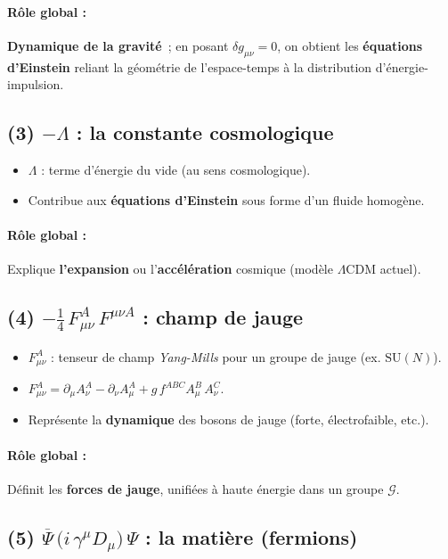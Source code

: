 \documentclass[12pt]{article}
\begin{document}
\paragraph{R\^ole global :}
\textbf{Dynamique de la gravit\'e}~; en posant \(\delta g_{\mu\nu}=0\), 
on obtient les \textbf{\'equations d'Einstein} reliant la g\'eom\'etrie de l'espace-temps 
\`a la distribution d'\'energie-impulsion.

\subsection{(3) \(\displaystyle -\Lambda\) : la constante cosmologique}

\begin{itemize}
\item \(\Lambda\) : terme d'\'energie du vide (au sens cosmologique).
\item Contribue aux \textbf{\'equations d'Einstein} sous forme d'un fluide homog\`ene.
\end{itemize}
\paragraph{R\^ole global :}
Explique \textbf{l'expansion} ou l'\textbf{acc\'el\'eration} cosmique 
(mod\`ele \(\Lambda\mathrm{CDM}\) actuel).

\subsection{(4) \(\displaystyle -\tfrac{1}{4}\,F_{\mu\nu}^A\,F^{\mu\nu A}\) : champ de jauge}

\begin{itemize}
\item \(F_{\mu\nu}^A\) : tenseur de champ \emph{Yang-Mills} pour un groupe de jauge (ex. \(\mathrm{SU}(N)\)).
\item \(\displaystyle F_{\mu\nu}^A 
        = \partial_\mu A_\nu^A - \partial_\nu A_\mu^A + g\,f^{ABC}A_\mu^B\,A_\nu^C\).
\item Repr\'esente la \textbf{dynamique} des bosons de jauge (forte, \'electrofaible, etc.).
\end{itemize}
\paragraph{R\^ole global :}
D\'efinit les \textbf{forces de jauge}, unifi\'ees \`a haute \'energie dans un groupe \(\mathcal{G}\).

\subsection{(5) \(\displaystyle \overline{\Psi}\,\bigl(i\,\gamma^\mu D_\mu\bigr)\,\Psi\) : la mati\`ere (fermions)}
\end{document}
